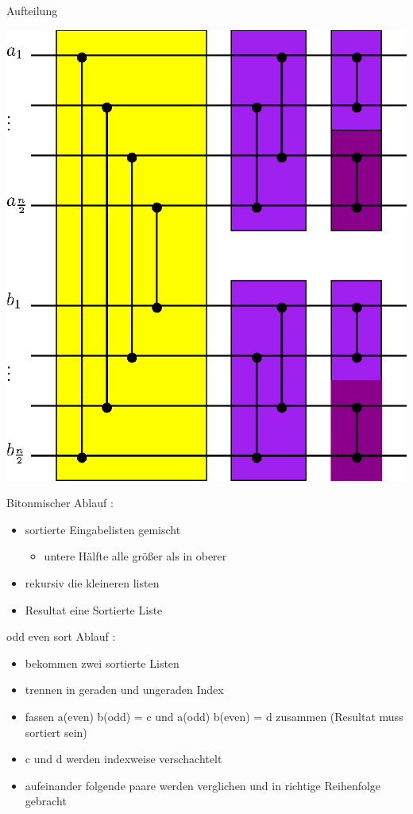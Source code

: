 \documentclass[ucs,9pt]{beamer}
\begin{document}
\begin{frame}{Aufteilung}
\begin{center}
\includegraphics[scale=0.6]{bitonmischer.eps}
\end{center}
\end{frame}

\begin{frame}{Bitonmischer}
Ablauf :
\begin{itemize}
\item sortierte Eingabelisten gemischt
	\begin{itemize}
	\item untere Hälfte alle größer als in oberer
	\end{itemize}
\item rekursiv die kleineren listen 
\item Resultat eine Sortierte Liste
\end{itemize}
\end{frame}

\begin{frame}{odd even sort}
Ablauf :
\begin{itemize}
\item bekommen zwei sortierte Listen
\item trennen in geraden und ungeraden Index
\item fassen a(even) b(odd) = c und a(odd) b(even) = d zusammen (Resultat muss sortiert sein)
\item c und d werden indexweise verschachtelt
\item aufeinander folgende paare werden verglichen und in richtige Reihenfolge gebracht
\end{itemize}
\end{frame}
\end{document}
